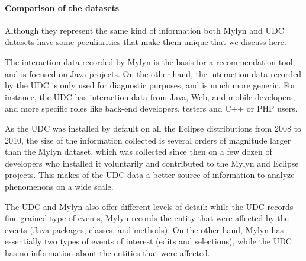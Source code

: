 \documentclass[times]{smrauth}
\begin{document}










\paragraph{Comparison of the datasets}
Although they represent the same kind of information both Mylyn and UDC datasets have some peculiarities that make them unique that we discuss here.

The interaction data recorded by Mylyn is the basis for a recommendation tool, and is focused on Java projects. On the other hand, the interaction data recorded by the UDC is only used for diagnostic purposes, and is much more generic. For instance, the UDC has interaction data from Java, Web, and mobile developers, and more specific roles like back-end developers, testers and C++ or PHP users. 

As the UDC was installed by default on all the Eclipse distributions from 2008 to 2010, the size of the information collected is several orders of magnitude larger than the Mylyn dataset, which was collected since then on a few dozen of developers who installed it voluntarily and contributed to the Mylyn and Eclipse projects. This makes of the UDC data a better source of information to analyze phenomenons on a wide scale.

The UDC and Mylyn also offer different levels of detail: while the UDC records fine-grained type of events, Mylyn records the entity that were affected by the events (Java packages, classes, and methods). On the other hand, Mylyn has essentially two types of events of interest (edits and selections), while the UDC has no information about the entities that were affected.
\end{document}
